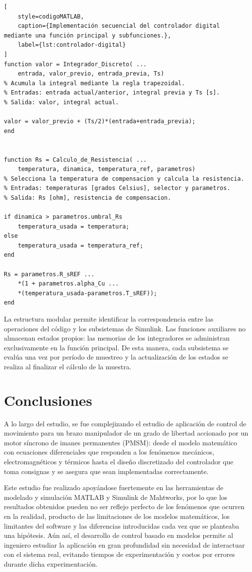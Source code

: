 \documentclass[blue,fullpaper]{ludusofficial}  %
\begin{document}
\begin{lstlisting}[
    style=codigoMATLAB,
    caption={Implementación secuencial del controlador digital mediante una función principal y subfunciones.},
    label={lst:controlador-digital}
]
function valor = Integrador_Discreto( ...
    entrada, valor_previo, entrada_previa, Ts)
% Acumula la integral mediante la regla trapezoidal.
% Entradas: entrada actual/anterior, integral previa y Ts [s].
% Salida: valor, integral actual.

valor = valor_previo + (Ts/2)*(entrada+entrada_previa);
end


function Rs = Calculo_de_Resistencia( ...
    temperatura, dinamica, temperatura_ref, parametros)
% Selecciona la temperatura de compensacion y calcula la resistencia.
% Entradas: temperaturas [grados Celsius], selector y parametros.
% Salida: Rs [ohm], resistencia de compensacion.

if dinamica > parametros.umbral_Rs
    temperatura_usada = temperatura;
else
    temperatura_usada = temperatura_ref;
end

Rs = parametros.R_sREF ...
    *(1 + parametros.alpha_Cu ...
    *(temperatura_usada-parametros.T_sREF));
end
\end{lstlisting}

La estructura modular permite identificar la correspondencia entre las operaciones del código y los subsistemas de Simulink. Las funciones auxiliares no almacenan estados propios: las memorias de los integradores se administran exclusivamente en la función principal. De esta manera, cada subsistema se evalúa una vez por período de muestreo y la actualización de los estados se realiza al finalizar el cálculo de la muestra.

\clearpage
\section{Conclusiones}
A lo largo del estudio, se fue complejizando el estudio de aplicación de control de movimiento para un brazo manipulador de un grado de libertad accionado por un motor síncrono de imanes permanentes (PMSM): desde el modelo matemático con ecuaciones diferenciales que responden a los fenómenos mecánicos, electromagnéticos y térmicos hasta el diseño discretizado del controlador que toma consignas y se asegura que sean implementadas correctamente.

Este estudio fue realizado apoyándose fuertemente en las herramientas de modelado y simulación MATLAB y Simulink de Mahtworks, por lo que los resultados obtenidos pueden no ser reflejo perfecto de los fenómenos que ocurren en la realidad, producto de las limitaciones de los modelos matemáticos, los limitantes del software y las diferencias introducidas cada vez que se planteaba una hipótesis. Aún así, el desarrollo de control basado en modelos permite al ingeniero estudiar la aplicación en gran profundidad sin necesidad de interactuar con el sistema real, evitando tiempos de experimentación y costos por errores durante dicha experimentación.
\end{document}
